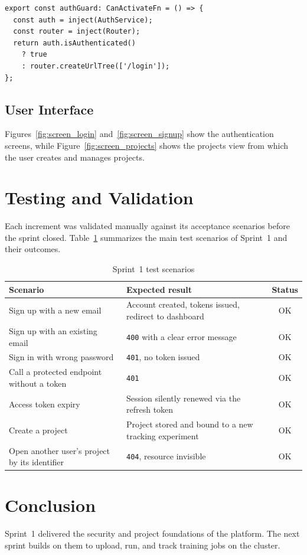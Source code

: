 \begin{lstlisting}[caption={Angular route guard protecting the dashboard routes.},label={lst:auth-guard}]
export const authGuard: CanActivateFn = () => {
  const auth = inject(AuthService);
  const router = inject(Router);
  return auth.isAuthenticated()
    ? true
    : router.createUrlTree(['/login']);
};
\end{lstlisting}

\subsection{User Interface}
Figures~\ref{fig:screen_login} and~\ref{fig:screen_signup} show the
authentication screens, while Figure~\ref{fig:screen_projects} shows the
projects view from which the user creates and manages projects.

\section{Testing and Validation}
Each increment was validated manually against its acceptance scenarios before
the sprint closed. Table~\ref{tab:tests-s1} summarizes the main test scenarios of
Sprint~1 and their outcomes.

\begin{table}[H]\centering
\renewcommand{\arraystretch}{1.25}
\caption{Sprint~1 test scenarios}\label{tab:tests-s1}
\begin{tabularx}{\textwidth}{|X|X|c|}
\hline
\textbf{Scenario} & \textbf{Expected result} & \textbf{Status}\\
\hline
Sign up with a new email & Account created, tokens issued, redirect to dashboard & OK\\ \hline
Sign up with an existing email & \texttt{400} with a clear error message & OK\\ \hline
Sign in with wrong password & \texttt{401}, no token issued & OK\\ \hline
Call a protected endpoint without a token & \texttt{401} & OK\\ \hline
Access token expiry & Session silently renewed via the refresh token & OK\\ \hline
Create a project & Project stored and bound to a new tracking experiment & OK\\ \hline
Open another user's project by its identifier & \texttt{404}, resource invisible & OK\\ \hline
\end{tabularx}
\end{table}

\section*{Conclusion}
Sprint~1 delivered the security and project foundations of the platform. The next
sprint builds on them to upload, run, and track training jobs on the cluster.
